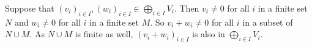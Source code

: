 Suppose that $(v_i)_{i\in I},(w_i)_{i \in I} \in \bigoplus_{i\in I} V_i$. Then $v_i \neq 0$ for all $i$ in a finite set $N$ and $w_i \neq 0 $ for all $i$ in a finite set $M$. So $v_i+w_i \neq 0$ for all $i$ in a subset of $N\cup M$. As $N\cup M$ is finite as well, $(v_i+w_i)_{i\in I}$ is also in $\bigoplus_{i\in I} V_i$.
